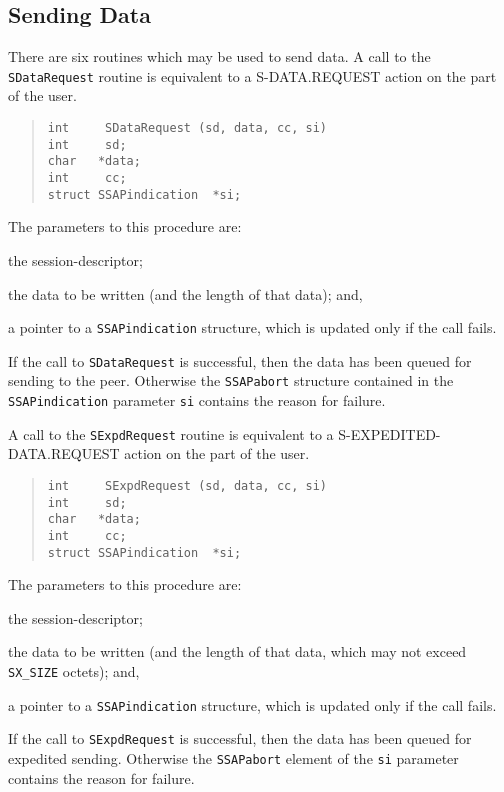 \subsection	{Sending Data}
There are six routines which may be used to send data.
A call to the \verb"SDataRequest" routine is equivalent to a
{\sf S-DATA.REQUEST\/} action on the part of the user.
\begin{quote}\small\begin{verbatim}
int     SDataRequest (sd, data, cc, si)
int     sd;
char   *data;
int     cc;
struct SSAPindication  *si;
\end{verbatim}\end{quote}
The parameters to this procedure are:
\begin{describe}
\item[\verb"sd":] the session-descriptor;

\item[\verb"data"/\verb"cc":] the data to be written (and the length of that
data);
and,

\item[\verb"si":] a pointer to a \verb"SSAPindication" structure, which is updated
only if the call fails.
\end{describe}
If the call to \verb"SDataRequest" is successful,
then the data has been queued for sending to the peer.
Otherwise the \verb"SSAPabort" structure contained in
the \verb"SSAPindication" parameter
\verb"si" contains the reason for failure.

A call to the \verb"SExpdRequest" routine is equivalent to a
{\sf S-EXPEDITED-DATA.REQUEST\/} action on the part of the user.
\begin{quote}\small\begin{verbatim}
int     SExpdRequest (sd, data, cc, si)
int     sd;
char   *data;
int     cc;
struct SSAPindication  *si;
\end{verbatim}\end{quote}
The parameters to this procedure are:
\begin{describe}
\item[\verb"sd":] the session-descriptor;

\item[\verb"data"/\verb"cc":] the data to be written (and the length of that
data, which may not exceed \verb"SX_SIZE" octets);
and,

\item[\verb"si":] a pointer to a \verb"SSAPindication" structure, which is updated
only if the call fails.
\end{describe}
If the call to \verb"SExpdRequest" is successful,
then the data has been queued for expedited sending.
Otherwise the \verb"SSAPabort" element of the \verb"si" parameter
contains the reason for failure.

